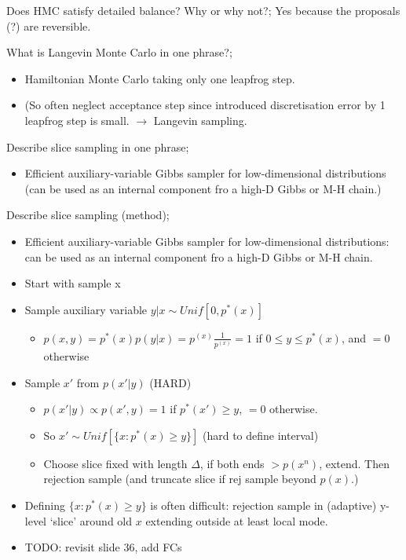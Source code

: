 \documentclass{article}
\begin{document}
Does HMC satisfy detailed balance? Why or why not?; Yes because the proposals (?) are reversible.

What is Langevin Monte Carlo in one phrase?; \begin{itemize} \item Hamiltonian Monte Carlo taking only one leapfrog step. \item (So often neglect acceptance step since introduced discretisation error by 1 leapfrog step is small. $\to$ Langevin sampling. \end{itemize}  

Describe slice sampling in one phrase; \begin{itemize} \item Efficient auxiliary-variable Gibbs sampler for low-dimensional distributions (can be used as an internal component fro a high-D Gibbs or M-H chain.) \end{itemize}

Describe slice sampling (method); \begin{itemize} \item Efficient auxiliary-variable Gibbs sampler for low-dimensional distributions: can be used as an internal component fro a high-D Gibbs or M-H chain. \item Start with sample x \item Sample auxiliary variable $y|x \sim Unif[0, p^*(x)]$ \begin{itemize} \item $p(x, y) = p^*(x)p(y|x) = p^(x)\frac{1}{p^(x)}=1$ if $0\leq y \leq p^*(x)$, and $=0$ otherwise \end{itemize} \item Sample $x'$ from $p(x'|y)$ (HARD) \begin{itemize} \item $p(x'|y) \propto p(x',y) = 1$ if $p^*(x') \geq y$, $=0$ otherwise. \item So $x' \sim Unif[\{x: p^*(x) \geq y\} ]$ (hard to define interval) \item Choose slice fixed with length $\Delta$, if both ends $> p(x^n)$, extend. Then rejection sample (and truncate slice if rej sample beyond $p(x)$.) \end{itemize} \item Defining $\{x:p^*(x)\geq y \}$ is often difficult: rejection sample in (adaptive) y-level `slice' around old $x$ extending outside at least local mode. \item TODO: revisit slide 36, add FCs \end{itemize}
\end{document}
